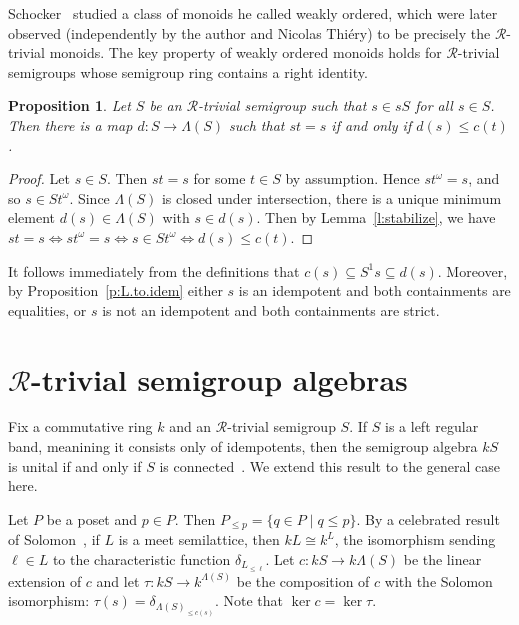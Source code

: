 \documentclass[reqno,11pt]{amsart}
\newcommand{\R}{\mathrel{\mathscr R}} %
\newtheorem{Prop}[Thm]{Proposition}
\numberwithin{equation}{section}
\begin{document}
Schocker~\cite{SchockerRtrivial} studied a class of monoids he called weakly ordered, which were later observed (independently by the author and Nicolas Thi\'ery) to be precisely the $\mathscr R$-trivial monoids.  The key property of weakly ordered monoids holds for $\mathscr R$-trivial semigroups whose semigroup ring contains a right identity.

\begin{Prop}\label{p:descent}
Let $S$ be an $\mathscr R$-trivial semigroup such that $s\in sS$ for all $s\in S$.  Then there is a map $d\colon S\to \Lambda(S)$ such that $st=s$ if and only if $d(s)\leq c(t)$. \end{Prop}
\begin{proof}
    Let $s\in S$.  Then $st=s$ for some $t\in S$ by assumption.  Hence $st^\omega =s$, and so $s\in St^\omega$.  Since $\Lambda(S)$ is closed under intersection, there is a unique minimum element $d(s)\in \Lambda(S)$ with $s\in d(s)$.  Then by Lemma~\ref{l:stabilize}, we have $st=s\iff st^\omega=s\iff s\in St^\omega\iff d(s)\leq c(t)$.
    \end{proof}

    It follows immediately from the definitions   that $c(s)\subseteq S^1s\subseteq d(s)$. Moreover, by Proposition~\ref{p:L.to.idem} either $s$ is an idempotent and both containments are equalities, or $s$ is not an idempotent and both containments are strict. 

\section{$\R$-trivial semigroup algebras}
Fix a commutative ring $k$ and an $\R$-trivial semigroup $S$.  If $S$ is a left regular band, meanining it consists only of idempotents, then the semigroup algebra $kS$ is unital if and only if $S$ is connected~\cite[Theorem~4.15]{ourmemoirs}.  We extend this result to the general case here. 



Let $P$ be a poset and $p\in P$.  Then $P_{\leq p} = \{q\in P\mid q\leq p\}$.
By a celebrated result of Solomon~\cite{Burnsidealgebra}, if $L$ is a meet semilattice, then $kL\cong k^L$, the isomorphism sending $\ell\in L$ to the characteristic function $\delta_{L_{\leq \ell}}$.  Let $c\colon kS\to k\Lambda(S)$ be the linear extension of $c$ and let $\tau\colon kS\to k^{\Lambda(S)}$ be the composition of $c$ with the Solomon isomorphism: $\tau(s)=\delta_{\Lambda(S)_{\leq c(s)}}$.  Note that $\ker c=\ker \tau$. 
\end{document}
